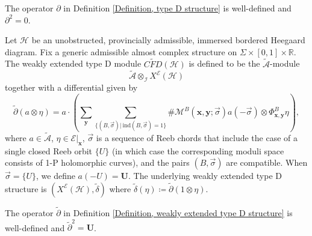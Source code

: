 \documentclass[10pt,a4paper]{amsart}
\begin{document}
\begin{prop}\label{Proposition, type D structure is well defined}
The operator $\partial$ in Definition \ref{Definition, type D structure} is well-defined and $\partial^2=0$. 
\end{prop}

\begin{defn}\label{Definition, weakly extended type D structure}
Let $\mathcal{H}$ be an unobstructed, provincially admissible, immersed bordered Heegaard diagram. Fix a generic admissible almost complex structure on $\Sigma\times [0,1] \times \mathbb{R}$. The weakly extended type D module $\widetilde{CFD}(\mathcal{H})$ is defined to be the $\tilde{\mathcal{A}}$-module $$\tilde{\mathcal{A}}\otimes_{\mathcal{I}}X^{\mathcal{E}}(\mathcal{H})$$ together with a differential given by 
$$\tilde{\partial} (a\otimes \eta)=a\cdot(\sum_{\bm{y}}\sum_{\{(B,\overrightarrow{\sigma})|\ \text{ind}(B,\overrightarrow{\sigma})=1\}}\#\mathcal{M}^B(\bm{x},\bm{y};\overrightarrow{\sigma})a(-\overrightarrow{\sigma})\otimes \Phi^B_{\bm{x},\bm{y}}\eta),$$
where $a\in\tilde{\mathcal{A}}$, $\eta\in \mathcal{E}|_{\bm{x}}$, $\overrightarrow{\sigma}$ is a sequence of Reeb chords that include the case of a single closed Reeb orbit $\{U\}$ (in which case the corresponding moduli space consists of 1-P holomorphic curves), and the pairs $(B,\overrightarrow{\sigma})$ are compatible. When $\overrightarrow{\sigma}=\{U\}$, we define $a(-U)=\bm{U}$. The underlying weakly extended type D structure is $(X^{\mathcal{E}}(\mathcal{H}),\tilde{\delta})$ where $\tilde{\delta}(\eta)\coloneqq \tilde{\partial}(1\otimes \eta)$.
\end{defn}

\begin{prop}\label{Proposition, weakly extended type D strucuture is well defined.}
The operator $\tilde{\partial}$ in Definition \ref{Definition, weakly extended type D structure} is well-defined and $\tilde{\partial}^2=\bm{U}$. 
\end{prop}
\end{document}
